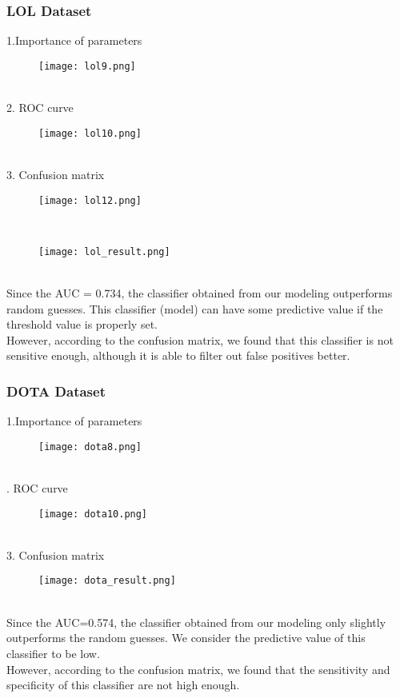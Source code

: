 \documentclass[a4paper,fleqn]{cas-sc}
\begin{document}
\subsubsection{LOL Dataset}
 1.Importance of parameters\\
 \begin{figure}[h!]
	\centering
		\texttt{[image: lol9.png]}
	\caption{}
	\label{FIG:1}
\end{figure}\\
2. ROC curve\\
\begin{figure}[h!]
	\centering
		\texttt{[image: lol10.png]}
	\caption{}
	\label{FIG:1}
\end{figure}\\
3. Confusion matrix\\
\begin{figure}[h!]
	\centering
		\texttt{[image: lol12.png]}
	\caption{}
	\label{FIG:1}
\end{figure}\\
\begin{figure}[h!]
	\centering
		\texttt{[image: lol\_result.png]}
	\caption{}
	\label{FIG:1}
\end{figure}\\
Since the AUC = 0.734, the classifier obtained from our modeling outperforms random guesses. This classifier (model) can have some predictive value if the threshold value is properly set.\\
However, according to the confusion matrix, we found that this classifier is not sensitive enough, although it is able to filter out false positives better.\\
\subsubsection{DOTA Dataset}
 1.Importance of parameters\\
 \begin{figure}[h!]
	\centering
		\texttt{[image: dota8.png]}
	\caption{}
	\label{FIG:1}
\end{figure}\\
. ROC curve\\
\begin{figure}[h!]
	\centering
		\texttt{[image: dota10.png]}
	\caption{}
	\label{FIG:1}
\end{figure}\\
3. Confusion matrix\\
\begin{figure}[h!]
	\centering
		\texttt{[image: dota\_result.png]}
	\caption{}
	\label{FIG:1}
\end{figure}\\
Since the AUC=0.574, the classifier obtained from our modeling only slightly outperforms the random guesses. We consider the predictive value of this classifier to be low.\\
However, according to the confusion matrix, we found that the sensitivity and specificity of this classifier are not high enough.\\
\end{document}
